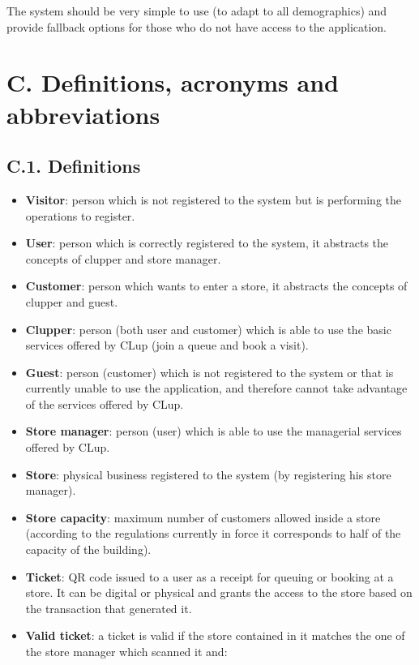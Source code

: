 The system should be very simple to use (to adapt to all demographics) and provide fallback options for those who do not have access to the application.

\section{C. Definitions, acronyms and abbreviations}

\subsection{C.1. Definitions}

\begin{itemize}
\item
  \textbf{Visitor}: person which is not registered to the system but is performing the operations to register.
\item
  \textbf{User}: person which is correctly registered to the system, it abstracts the concepts of clupper and store manager.
\item
  \textbf{Customer}: person which wants to enter a store, it abstracts the concepts of clupper and guest.
\item
  \textbf{Clupper}: person (both user and customer) which is able to use the basic services offered by CLup (join a queue and book a visit).
\item
  \textbf{Guest}: person (customer) which is not registered to the system or that is currently unable to use the application, and therefore cannot take advantage of the services offered by CLup.
\item
  \textbf{Store manager}: person (user) which is able to use the managerial services offered by CLup.
\item
  \textbf{Store}: physical business registered to the system (by registering his store manager).
\item
  \textbf{Store capacity}: maximum number of customers allowed inside a store (according to the regulations currently in force it corresponds to half of the capacity of the building).
\item
  \textbf{Ticket}: QR code issued to a user as a receipt for queuing or booking at a store. It can be digital or physical and grants the access to the store based on the transaction that generated it.
\item
  \textbf{Valid ticket}: a ticket is valid if the store contained in it matches the one of the store manager which scanned it and:
  \begin{itemize}

\end{itemize}
\end{itemize}
